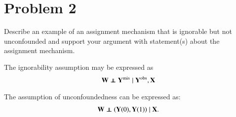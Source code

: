 
\section{Problem 2}

\begin{quoting}
  Describe an example of an assignment mechanism that is ignorable but
  not unconfounded and support your argument with statement(s) about
  the assignment mechanism.
\end{quoting}

The ignorability assumption \citep{rubin1978} may be expressed as
\begin{align}\label{eq:ignorable}
  \W \ind \Y^{\mis} \mid \Y^{\obs}, \X
\end{align}

The assumption of unconfoundedness \citep{PS} can be expressed as:
\begin{align}\label{eq:unconfounded}
  \W \ind (\Y(0), \Y(1)) \mid \X.
\end{align}



